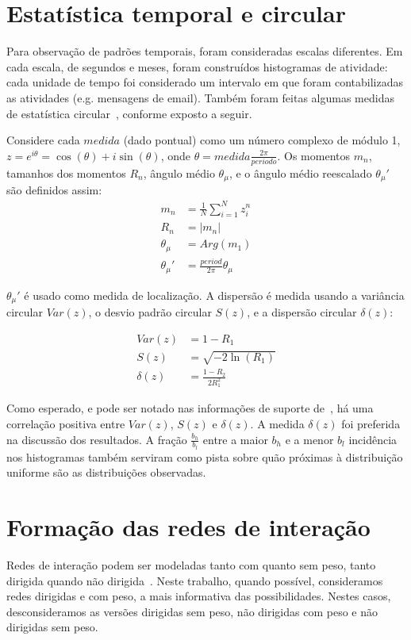 \documentclass[a4paper,openright,12pt]{report} %
\begin{document}
\section{Estatística temporal e circular}\label{sec:cir}
Para observação de padrões temporais, foram consideradas escalas diferentes.
Em cada escala, de segundos e meses, foram construídos histogramas de atividade: cada unidade de tempo foi considerado um intervalo em que foram contabilizadas as atividades (e.g. mensagens de email).
Também foram feitas algumas medidas de estatística circular~\cite{wpCirc}, conforme exposto a seguir.

Considere cada $ medida $ (dado pontual) como um número complexo de módulo 1, $z=e^{i\theta}=\cos(\theta)+i\sin(\theta)$, onde $\theta= medida \frac{2\pi}{periodo}$. Os momentos $m_n$, tamanhos dos momentos $R_n$, ângulo médio $\theta_\mu$, e o ângulo médio reescalado $\theta_\mu'$ são definidos assim:
\begin{align}\label{eq:cmom}
    m_n&=\frac{1}{N}\sum_{i=1}^N z_i^n \nonumber\\
    R_n&=|m_n|\\
    \theta_\mu&=Arg(m_1) \nonumber \\
    \theta_\mu'&=\frac{period}{2\pi} \theta_\mu \nonumber
\end{align}

$\theta_\mu'$ é usado como medida de localização. A dispersão é medida usando a variância circular $Var(z)$, 
o desvio padrão circular $S(z)$, e a dispersão circular $\delta(z)$:

\begin{align}\label{eq:cmd}
    Var(z)&=1 - R_1 \nonumber\\
    S(z)&= \sqrt{-2\ln(R_1)}\\
    \delta(z)&=\frac{1-R_2}{2 R_1^2} \nonumber
\end{align}

Como esperado, e pode ser notado nas informações de suporte de~\cite{timeS}, há uma correlação positiva entre $Var(z)$, $S(z)$ e $\delta(z)$.
A medida $\delta(z)$ foi preferida na discussão dos resultados.
A fração $\frac{b_h}{b_l}$ entre a maior $b_h $ e a menor $b_l$ incidência nos histogramas
também serviram como pista sobre quão próximas à distribuição uniforme são as distribuições observadas.


\section{Formação das redes de interação}\label{sec:intNet}
Redes de interação podem ser modeladas tanto com quanto sem peso, tanto dirigida quando não dirigida~\cite{bird,newmanCommunityDirected,newmanCommunity2013,newmanBook}.
Neste trabalho, quando possível, consideramos redes dirigidas e com peso, a mais informativa das possibilidades.
Nestes casos, desconsideramos as versões dirigidas sem peso, não dirigidas com peso e não dirigidas sem peso.
\end{document}
